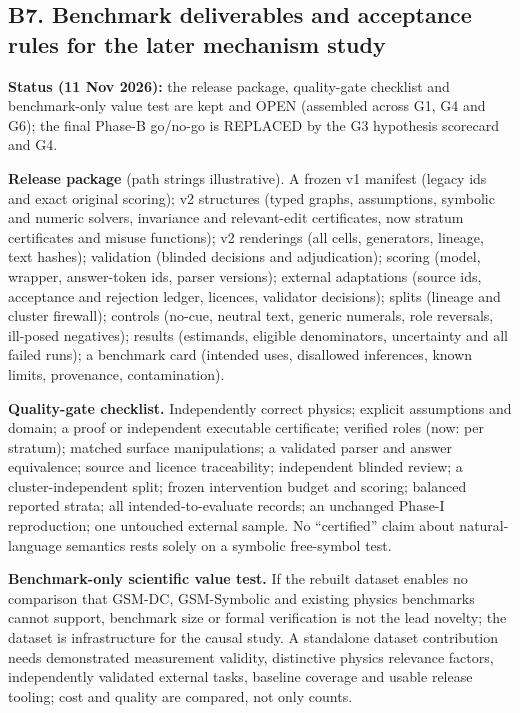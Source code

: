 \documentclass[10pt,a4paper]{article}
\begin{document}
\subsection{B7. Benchmark deliverables and acceptance rules for the later mechanism study}\label{sec:phaseB-B7}

\textbf{Status (11 Nov 2026):} the release package, quality-gate checklist and benchmark-only value test are kept
and OPEN (assembled across G1, G4 and G6); the final Phase-B go/no-go is REPLACED by the G3 hypothesis scorecard and
G4.

\textbf{Release package} (path strings illustrative). A frozen v1 manifest (legacy ids and exact original
scoring); v2 structures (typed graphs, assumptions, symbolic and numeric solvers, invariance and relevant-edit
certificates, now stratum certificates and misuse functions); v2 renderings (all cells, generators, lineage, text
hashes); validation (blinded decisions and adjudication); scoring (model, wrapper, answer-token ids, parser
versions); external adaptations (source ids, acceptance and rejection ledger, licences, validator decisions);
splits (lineage and cluster firewall); controls (no-cue, neutral text, generic numerals, role reversals, ill-posed
negatives); results (estimands, eligible denominators, uncertainty and all failed runs); a benchmark card
(intended uses, disallowed inferences, known limits, provenance, contamination).

\textbf{Quality-gate checklist.} Independently correct physics; explicit assumptions and domain; a proof or
independent executable certificate; verified roles (now: per stratum); matched surface manipulations; a validated
parser and answer equivalence; source and licence traceability; independent blinded review; a cluster-independent
split; frozen intervention budget and scoring; balanced reported strata; all intended-to-evaluate records; an
unchanged Phase-I reproduction; one untouched external sample. No ``certified'' claim about natural-language
semantics rests solely on a symbolic free-symbol test.

\textbf{Benchmark-only scientific value test.} If the rebuilt dataset enables no comparison that GSM-DC,
GSM-Symbolic and existing physics benchmarks cannot support, benchmark size or formal verification is not the lead
novelty; the dataset is infrastructure for the causal study. A standalone dataset contribution needs demonstrated
measurement validity, distinctive physics relevance factors, independently validated external tasks, baseline
coverage and usable release tooling; cost and quality are compared, not only counts.
\end{document}
